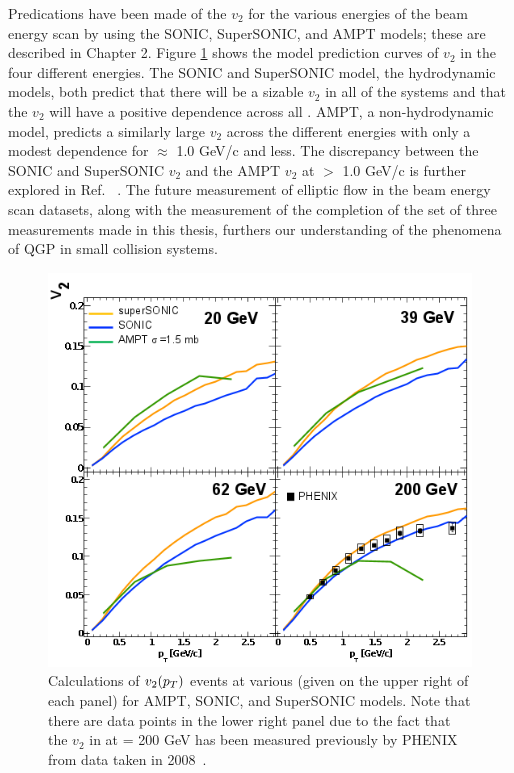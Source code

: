Predications have been made of the $v_2$ for the various energies of the \dau beam energy scan by using the SONIC, SuperSONIC, and AMPT models; these are described in Chapter 2. Figure \ref{fig:dau_bes_predictions} shows the model prediction curves of $v_2$ in the four different energies. The SONIC and SuperSONIC model, the hydrodynamic models, both predict that there will be a sizable $v_2$ in all of the \sqsn systems and that the $v_2$ will have a positive \sqsn dependence across all \pt. AMPT, a non-hydrodynamic model, predicts a similarly large $v_2$ across the different energies with only a modest \sqsn dependence for \pt $\approx$ 1.0 GeV/c and less. The discrepancy between the SONIC and SuperSONIC $v_2$ and the AMPT $v_2$ at \pt $>$ 1.0 GeV/c is further explored in Ref. ~\cite{PhysRevC.93.044910}. The future measurement of elliptic flow in the \dau beam energy scan datasets, along with the measurement of the completion of the set of three measurements made in this thesis, furthers our understanding of the phenomena of QGP in small collision systems.

\begin{figure}[!ht]
\begin{center}
\includegraphics[width=0.75\linewidth]{figs/dau_bescan_theory.png}
\caption{Calculations of $v_2(\mbox{$p_T$})$ \dau events at various \sqsn (given on the upper right of each panel) for AMPT, SONIC, and SuperSONIC models. Note that there are data points in the lower right panel due to the fact that the $v_2$ in \dau at \sqsn = 200 GeV has been measured previously by PHENIX from data taken in 2008~\cite{PhysRevC.93.044910}.}
\label{fig:dau_bes_predictions}
\end{center}
\end{figure}
